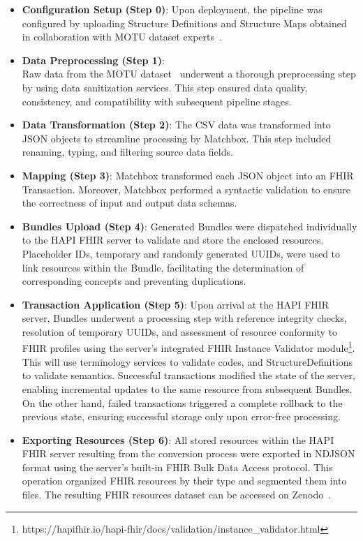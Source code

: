 \begin{itemize}
    \item \textbf{Configuration Setup (Step 0)}: Upon deployment, the pipeline was configured by uploading Structure Definitions and Structure Maps obtained in collaboration with MOTU dataset experts~\cite{arcobelli_motu_2023}. 
    \item \textbf{Data Preprocessing (Step 1)}:\\ Raw data from the MOTU dataset~\cite{arcobelli_motu_2024} underwent a thorough preprocessing step by using data sanitization services. This step ensured data quality, consistency, and compatibility with subsequent pipeline stages. 
    \item \textbf{Data Transformation (Step 2)}: The CSV data was transformed into JSON objects to streamline processing by Matchbox. This step included renaming, typing, and filtering source data fields. 
    \item \textbf{Mapping (Step 3)}: Matchbox transformed each JSON object into an FHIR Transaction. Moreover, Matchbox performed a syntactic validation to ensure the correctness of input and output data schemas. 
    \item \textbf{Bundles Upload (Step 4)}: Generated Bundles were dispatched individually to the HAPI FHIR server to validate and store the enclosed resources. Placeholder IDs, temporary and randomly generated UUIDs, were used to link resources within the Bundle, facilitating the determination of corresponding concepts and preventing duplications. 
    \item \textbf{Transaction Application (Step 5)}: Upon arrival at the HAPI FHIR server, Bundles underwent a processing step with reference integrity checks, resolution of temporary UUIDs, and assessment of resource conformity to FHIR profiles using the server's integrated FHIR Instance Validator module\footnote{https://hapifhir.io/hapi-fhir/docs/validation/instance\_validator.html}. This will use terminology services to validate codes, and StructureDefinitions to validate semantics. Successful transactions modified the state of the server, enabling incremental updates to the same resource from subsequent Bundles. On the other hand, failed transactions triggered a complete rollback to the previous state, ensuring successful storage only upon error-free processing. 
    \item \textbf{Exporting Resources (Step 6)}: All stored resources within the HAPI FHIR server resulting from the conversion process were exported in NDJSON format using the server's built-in FHIR Bulk Data Access protocol. This operation organized FHIR resources by their type and segmented them into files. The resulting FHIR resources dataset can be accessed on Zenodo~\cite{arcobelli_fhired_2024}.
\end{itemize}

